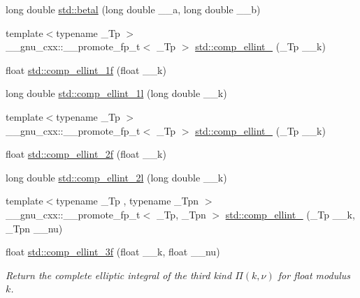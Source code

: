 \begin{DoxyCompactItemize}
\item 
long double \hyperlink{group__tr29124__math__spec__func_ga8caca1cef099f41a88111209c36ce06c}{std\+::betal} (long double \+\_\+\+\_\+a, long double \+\_\+\+\_\+b)
\item 
{\footnotesize template$<$typename \+\_\+\+Tp $>$ }\\\+\_\+\+\_\+gnu\+\_\+cxx\+::\+\_\+\+\_\+promote\+\_\+fp\+\_\+t$<$ \+\_\+\+Tp $>$ \hyperlink{group__tr29124__math__spec__func_ga63f1e2ba4b94e170554d36882ee2be1d}{std\+::comp\+\_\+ellint\+\_} (\+\_\+\+Tp \+\_\+\+\_\+k)
\item 
float \hyperlink{group__tr29124__math__spec__func_ga7fb5be999a8125cf7e55e630eb8444a1}{std\+::comp\+\_\+ellint\+\_\+1f} (float \+\_\+\+\_\+k)
\item 
long double \hyperlink{group__tr29124__math__spec__func_ga7247d3dd77c1ff5df3c059fed862dc48}{std\+::comp\+\_\+ellint\+\_\+1l} (long double \+\_\+\+\_\+k)
\item 
{\footnotesize template$<$typename \+\_\+\+Tp $>$ }\\\+\_\+\+\_\+gnu\+\_\+cxx\+::\+\_\+\+\_\+promote\+\_\+fp\+\_\+t$<$ \+\_\+\+Tp $>$ \hyperlink{group__tr29124__math__spec__func_gacd0057c6937200dc296c98d7e53f5112}{std\+::comp\+\_\+ellint\+\_} (\+\_\+\+Tp \+\_\+\+\_\+k)
\item 
float \hyperlink{group__tr29124__math__spec__func_ga21700f2f125c42b1f1da1f9c7eea1135}{std\+::comp\+\_\+ellint\+\_\+2f} (float \+\_\+\+\_\+k)
\item 
long double \hyperlink{group__tr29124__math__spec__func_ga47b647ec386c8d4b18a030c97842df18}{std\+::comp\+\_\+ellint\+\_\+2l} (long double \+\_\+\+\_\+k)
\item 
{\footnotesize template$<$typename \+\_\+\+Tp , typename \+\_\+\+Tpn $>$ }\\\+\_\+\+\_\+gnu\+\_\+cxx\+::\+\_\+\+\_\+promote\+\_\+fp\+\_\+t$<$ \+\_\+\+Tp, \+\_\+\+Tpn $>$ \hyperlink{group__tr29124__math__spec__func_gae3abb5ca753f218c4c17fe7dc9feabc4}{std\+::comp\+\_\+ellint\+\_} (\+\_\+\+Tp \+\_\+\+\_\+k, \+\_\+\+Tpn \+\_\+\+\_\+nu)
\item 
float \hyperlink{group__tr29124__math__spec__func_ga76834d3112f777703330892303267a39}{std\+::comp\+\_\+ellint\+\_\+3f} (float \+\_\+\+\_\+k, float \+\_\+\+\_\+nu)
\begin{DoxyCompactList}\small\item\em Return the complete elliptic integral of the third kind $ \Pi(k,\nu) $ for {\ttfamily float} modulus $ k $. \end{DoxyCompactList}\item 

\end{DoxyCompactItemize}
